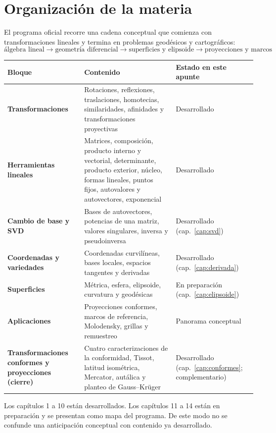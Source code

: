 \section{Organización de la materia}\label{cap:01}\label{sec:organizacion}

El programa oficial recorre una cadena conceptual que comienza con transformaciones lineales
y termina en problemas geodésicos y cartográficos:
\[
\boxed{\text{álgebra lineal}}
\longrightarrow
\boxed{\text{geometría diferencial}}
\longrightarrow
\boxed{\text{superficies y elipsoide}}
\longrightarrow
\boxed{\text{proyecciones y marcos}}
\]

\begin{center}
\begin{tabularx}{\textwidth}{>{\bfseries}p{34mm} X p{30mm}}
\toprule
Bloque & Contenido & Estado en este apunte\\
\midrule
Transformaciones &
Rotaciones, reflexiones, traslaciones, homotecias, similaridades, afinidades y
transformaciones proyectivas &
Desarrollado\\
Herramientas lineales &
Matrices, composición, producto interno y vectorial, determinante, producto exterior,
núcleo, formas lineales, puntos fijos, autovalores y autovectores, exponencial &
Desarrollado\\
Cambio de base y SVD &
Bases de autovectores, potencias de una matriz, valores singulares, inversa y
pseudoinversa &
Desarrollado (cap.~\ref{cap:svd})\\
Coordenadas y variedades &
Coordenadas curvilíneas, bases locales, espacios tangentes y derivadas &
Desarrollado (cap.~\ref{cap:derivada})\\
Superficies &
Métrica, esfera, elipsoide, curvatura y geodésicas &
En preparación (cap.~\ref{cap:elipsoide})\\
Aplicaciones &
Proyecciones conformes, marcos de referencia, Molodensky, grillas y remuestreo &
Panorama conceptual\\
Transformaciones conformes y proyecciones (cierre) &
Cuatro caracterizaciones de la conformidad, Tissot, latitud isométrica, Mercator,
autálica y planteo de Gauss--Krüger &
Desarrollado (cap.~\ref{cap:conformes}; complementario)\\
\bottomrule
\end{tabularx}
\end{center}

\begin{atencion}
Los capítulos 1 a 10 están desarrollados. Los capítulos 11 a 14 están en preparación y se
presentan como mapa del programa. De este modo no se confunde una anticipación conceptual
con contenido ya desarrollado.
\end{atencion}


